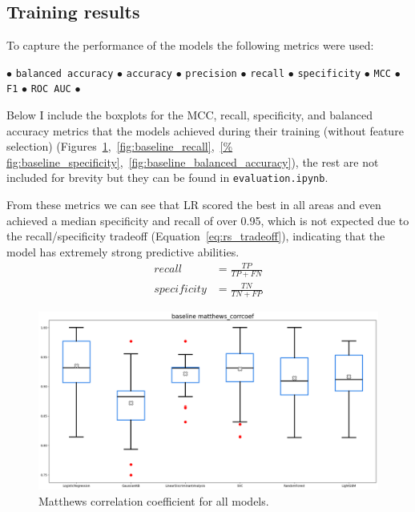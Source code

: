 \documentclass[12pt]{article}
\begin{document}
\subsection{Training results}

To capture the performance of the models the following metrics were used:
\begin{center}
    $\bullet$
    \texttt{balanced accuracy}
    $\bullet$
    \texttt{accuracy}
    $\bullet$
    \texttt{precision}
    $\bullet$
    \texttt{recall}
    $\bullet$
    \texttt{specificity}
    $\bullet$
    \texttt{MCC}
    $\bullet$
    \texttt{F1}
    $\bullet$
    \texttt{ROC AUC}
    $\bullet$
\end{center}

Below I include the boxplots for the MCC, recall, specificity, and balanced
accuracy metrics that the models achieved during their training (without
feature selection)
(Figures~\ref{fig:baseline_mcc},~\ref{fig:baseline_recall},~\ref{%
fig:baseline_specificity},~\ref{fig:baseline_balanced_accuracy}), the rest are
not included for brevity but they can be found in \texttt{evaluation.ipynb}.

From these metrics we can see that LR scored the best in all areas and even
achieved a median specificity and recall of over 0.95, which is not expected due
to the recall/specificity tradeoff (Equation~\ref{eq:rs_tradeoff}), indicating
that the model has extremely strong predictive abilities.
\begin{equation}
    \begin{aligned}
        recall &= \frac{TP}{TP + FN} \\
        specificity &= \frac{TN}{TN + FP}
    \end{aligned}
    \label{eq:rs_tradeoff}
\end{equation}

\begin{figure}[H]
    \centering
    \includegraphics[width=\textwidth]{ims/baseline_mcc.png}
    \caption{Matthews correlation coefficient for all models.}
    \label{fig:baseline_mcc}
\end{figure}
\end{document}

